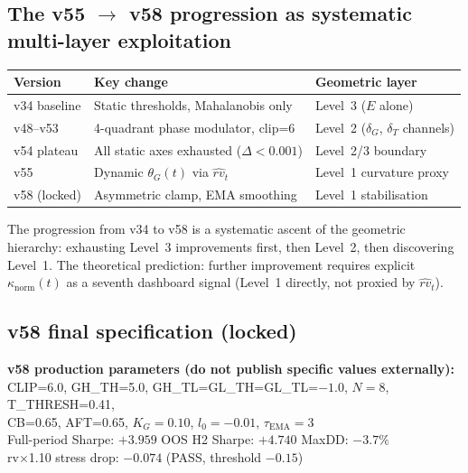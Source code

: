 \documentclass[11pt,a4paper]{article}
\theoremstyle{definition}
\begin{document}
\subsection{The v55 $\to$ v58 progression as systematic multi-layer exploitation}

\begin{center}
\renewcommand{\arraystretch}{1.3}
\begin{tabular}{lll}
\toprule
\textbf{Version} & \textbf{Key change} & \textbf{Geometric layer} \\
\midrule
v34 baseline & Static thresholds, Mahalanobis only & Level~3 ($E$ alone) \\
v48--v53 & 4-quadrant phase modulator, clip=6 & Level~2 ($\delta_G$, $\delta_T$ channels) \\
v54 plateau & All static axes exhausted ($\Delta<0.001$) & Level~2/3 boundary \\
v55 & Dynamic $\theta_G(t)$ via $\hat{rv}_t$ & Level~1 curvature proxy \\
v58 (locked) & Asymmetric clamp, EMA smoothing & Level~1 stabilisation \\
\bottomrule
\end{tabular}
\end{center}

The progression from v34 to v58 is a systematic ascent of the geometric hierarchy:
exhausting Level~3 improvements first, then Level~2, then discovering Level~1.
The theoretical prediction: further improvement requires explicit $\kappa_\mathrm{norm}(t)$
as a seventh dashboard signal (Level~1 directly, not proxied by $\hat{rv}_t$).

\subsection{v58 final specification (locked)}

\begin{lockedbox}
\textbf{v58 production parameters (do not publish specific values externally):}\\
CLIP=6.0, GH\_TH=5.0, GH\_TL=GL\_TH=GL\_TL=$-1.0$, $N=8$, T\_THRESH=0.41,\\
CB=0.65, AFT=0.65, $K_G=0.10$, $l_0=-0.01$, $\tau_\mathrm{EMA}=3$\\[4pt]
Full-period Sharpe: $+3.959$ \quad OOS H2 Sharpe: $+4.740$ \quad MaxDD: $-3.7\%$\\
rv$\times$1.10 stress drop: $-0.074$ (PASS, threshold $-0.15$)
\end{lockedbox}
\end{document}
